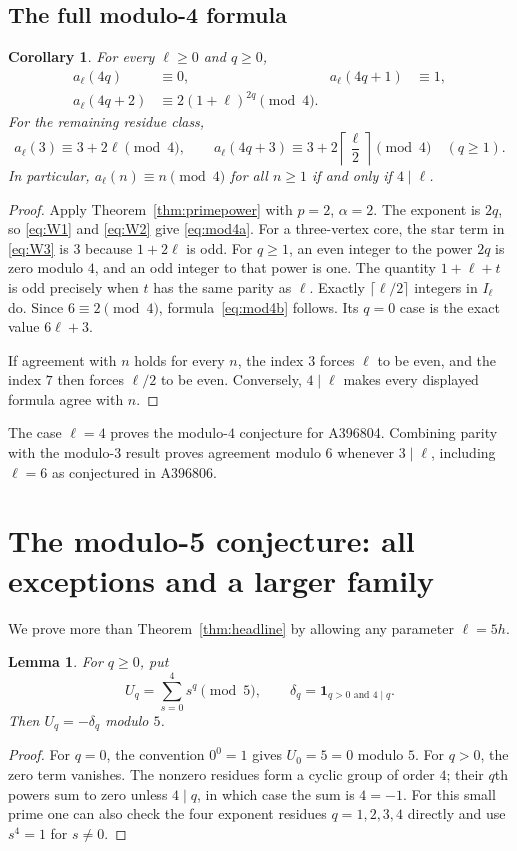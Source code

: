 \documentclass[11pt,letterpaper]{article}
\newtheorem{lemma}[theorem]{Lemma}
\newtheorem{corollary}[theorem]{Corollary}
\theoremstyle{definition}
\theoremstyle{remark}
\newcommand{\ind}{\mathbf 1}
\begin{document}
\subsection{The full modulo-4 formula}
\begin{corollary}\label{cor:mod4}
For every $\ell\ge0$ and $q\ge0$,
\begin{align}
 a_\ell(4q)&\equiv0,&
 a_\ell(4q+1)&\equiv1,\nonumber\\
 a_\ell(4q+2)&\equiv2(1+\ell)^{2q}\pmod4.\label{eq:mod4a}
\end{align}
For the remaining residue class,
\begin{equation}\label{eq:mod4b}
 a_\ell(3)\equiv3+2\ell\pmod4,
 \qquad
 a_\ell(4q+3)\equiv3+2\left\lceil\frac\ell2\right\rceil\pmod4
 \quad(q\ge1).
\end{equation}
In particular, $a_\ell(n)\equiv n\pmod4$ for all $n\ge1$ if and only if
$4\mid\ell$.
\end{corollary}
\begin{proof}
Apply Theorem~\ref{thm:primepower} with $p=2$, $\alpha=2$. The exponent
is $2q$, so \eqref{eq:W1} and \eqref{eq:W2} give
\eqref{eq:mod4a}. For a three-vertex core, the star term in
\eqref{eq:W3} is $3$ because $1+2\ell$ is odd. For $q\ge1$, an even
integer to the power $2q$ is zero modulo $4$, and an odd integer to that
power is one. The quantity $1+\ell+t$ is odd precisely when $t$ has the
same parity as $\ell$. Exactly $\lceil\ell/2\rceil$ integers in
$I_\ell$ do. Since $6\equiv2\pmod4$, formula~\eqref{eq:mod4b}
follows. Its $q=0$ case is the exact value $6\ell+3$.

If agreement with $n$ holds for every $n$, the index $3$ forces $\ell$
to be even, and the index $7$ then forces $\ell/2$ to be even. Conversely,
$4\mid\ell$ makes every displayed formula agree with $n$.
\end{proof}

The case $\ell=4$ proves the modulo-$4$ conjecture for A396804. Combining
parity with the modulo-$3$ result proves agreement modulo $6$ whenever
$3\mid\ell$, including $\ell=6$ as conjectured in A396806.

\section{The modulo-5 conjecture: all exceptions and a larger family}
\label{sec:mod5}
We prove more than Theorem~\ref{thm:headline} by allowing any parameter
$\ell=5h$.

\begin{lemma}\label{lem:powersums}
For $q\ge0$, put
\[
 U_q=\sum_{s=0}^4s^q\pmod5,
 \qquad \delta_q=\ind_{q>0\text{ and }4\mid q}.
\]
Then $U_q=-\delta_q$ modulo $5$.
\end{lemma}
\begin{proof}
For $q=0$, the convention $0^0=1$ gives $U_0=5=0$ modulo $5$.
For $q>0$, the zero term vanishes. The nonzero residues form a cyclic
group of order $4$; their $q$th powers sum to zero unless $4\mid q$,
in which case the sum is $4=-1$.
For this small prime one can also check the four exponent residues
$q=1,2,3,4$ directly and use $s^4=1$ for $s\ne0$.
\end{proof}
\end{document}
